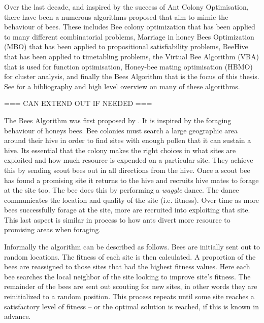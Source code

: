 Over the last decade, and inspired by the success of Ant Colony Optimisation, there have been a numerous algorithms proposed that aim to mimic the behaviour of bees. These includes Bee colony optimization that has been applied to many different combinatorial problems, Marriage in honey Bees Optimization (MBO) that has been applied to propositional satisfiability problems, BeeHive that has been applied to timetabling problems, the Virtual Bee Algorithm (VBA) that is used for function optimisation, Honey-bee mating optimisation (HBMO) for cluster analysis, and finally the Bees Algorithm that is the focus of this thesis. See \cite{LJDS:2009} for a bibliography and high level overview on many of these algorithms. 

=== CAN EXTEND OUT IF NEEDED ===

The Bees Algorithm was first proposed by \cite{PGKORZ:2005}. It is inspired by the foraging behaviour of honeys bees. Bee colonies must search a large geographic area around their hive in order to find sites with enough pollen that it can sustain a hive. Its essential that the colony makes the right choices in what sites are exploited and how much resource is expended on a particular site. They achieve this by sending scout bees out in all directions from the hive. Once a scout bee has found a promising site it returns to the hive and recruits hive mates to forage at the site too. The bee does this by performing a \emph{waggle} dance. The dance communicates the location and quality of the site (i.e. fitness). Over time as more bees successfully forage at the site, more are recruited into exploiting that site. This last aspect is similar in process to how ants divert more resource to promising areas when foraging. 


Informally the algorithm can be described as follows. Bees are initially sent out to random locations. The fitness of each site is then calculated. A proportion of the bees are reassigned to those sites that had the highest fitness values. Here each bee searches the local neighbor of the site looking to improve site's fitness. The remainder of the bees are sent out scouting for new sites, in other words they are reinitialized to a random position. This process repeats until some site reaches a satisfactory level of fitness -- or the optimal solution is reached, if this is known in advance.

